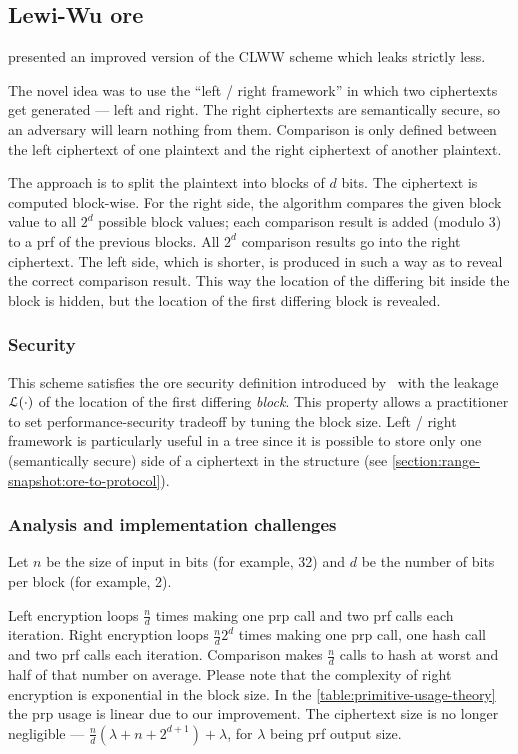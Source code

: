 \subsection{Lewi-Wu \acrshort{ore}}

	\textcite{lewi-wu-ore} presented an improved version of the CLWW scheme \cite{clww-ore} which leaks strictly less.

	The novel idea was to use the ``left / right framework'' in which two ciphertexts get generated --- left and right.
	The right ciphertexts are semantically secure, so an adversary will learn nothing from them.
	Comparison is only defined between the left ciphertext of one plaintext and the right ciphertext of another plaintext.

	The approach is to split the plaintext into blocks of $d$ bits.
	The ciphertext is computed block-wise.
	For the right side, the algorithm compares the given block value to all $2^d$ possible block values; each comparison result is added (modulo 3) to a \acrshort{prf} of the previous blocks.
	All $2^d$ comparison results go into the right ciphertext.
	The left side, which is shorter, is produced in such a way as to reveal the correct comparison result.
	This way the location of the differing bit inside the block is hidden, but the location of the first differing block is revealed.

	\subsubsection{Security}
		This scheme satisfies the \acrshort{ore} security definition introduced by~\textcite{clww-ore} with the leakage $\mathcal{L}(\cdot)$ of the location of the first differing \emph{block}.
		This property allows a practitioner to set performance-security tradeoff by tuning the block size.
		Left / right framework is particularly useful in a {\BPlus} tree since it is possible to store only one (semantically secure) side of a ciphertext in the structure (see \cref{section:range-snapshot:ore-to-protocol}).

	\subsubsection{Analysis and implementation challenges}

		Let $n$ be the size of input in bits (for example, 32) and $d$ be the number of bits per block (for example, 2).

		Left encryption loops $\frac{n}{d}$ times making one \acrshort{prp} call and two \acrshort{prf} calls each iteration.
		Right encryption loops $\frac{n}{d} 2^d$ times making one \acrshort{prp} call, one hash call and two \acrshort{prf} calls each iteration.
		Comparison makes $\frac{n}{d}$ calls to hash at worst and half of that number on average.
		Please note that the complexity of right encryption is exponential in the block size.
		In the \cref{table:primitive-usage-theory} the \acrshort{prp} usage is linear due to our improvement.
		The ciphertext size is no longer negligible --- $\frac{n}{d} \left(\lambda + n + 2^{d + 1} \right) + \lambda$, for $\lambda$ being \acrshort{prf} output size.

